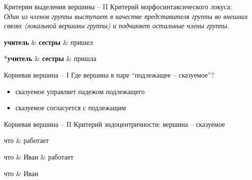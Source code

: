 \documentclass{beamer}
\begin{document}
\begin{frame}{Критерии выделения вершины -- II}
Критерий морфосинтаксического локуса:\\
\medskip
{\small \textit{Один из членов группы выступает в качестве представителя группы во внешних связях (локальной вершины группы) и подчиняет остальные члены группы.}}

\begin{center}
\begin{dependency}[theme = simple]
   \begin{deptext}[column sep=1em]
      \textbf{учитель} \& \textbf{сестры} \& пришел \\
   \end{deptext}
\end{dependency}
\begin{dependency}[theme = simple]
   \begin{deptext}[column sep=1em]
      *\textbf{учитель} \& \textbf{сестры} \& пришла \\
   \end{deptext}
\end{dependency}
\end{center}
\end{frame}

\begin{frame}{Корневая вершина -- I}
Где вершина в паре ``подлежащее -- сказуемое''?\\
\smallskip
\begin{itemize}
    \item сказуемое управляет падежом подлежащего
    \item сказуемое согласуется с подлежащим
\end{itemize}
\end{frame}

\begin{frame}{Корневая вершина -- II}
Критерий эндоцентричности: вершина -- сказуемое\\
\smallskip
\begin{center}
\begin{dependency}[theme = simple]
   \begin{deptext}[column sep=1em]
      что \& работает \\
   \end{deptext}
\end{dependency}
\begin{dependency}[theme = simple]
   \begin{deptext}[column sep=1em]
      что \& Иван \& работает \\
   \end{deptext}
\end{dependency}
\begin{dependency}[theme = simple]
   \begin{deptext}[column sep=1em]
      что \& Иван  \\
   \end{deptext}
\end{dependency}
\end{center}
\end{frame}
\end{document}
